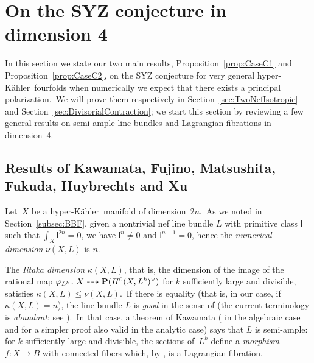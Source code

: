 \documentclass[12pt]{amsart}
\def\P{{\bf P}}
\def\phi{\varphi}
\def\otp{}
\def\dra{\dashrightarrow}
\def\hk{hyper-K\"ahler}
\theoremstyle{remark}
\def\lll{\ensuremath{\mathsf l}}
\begin{document}

\section{On the SYZ conjecture in dimension 4}\label{sec:SYZ}

In this section we state our two main results, Proposition~\ref{prop:CaseC1} and Proposition~\ref{prop:CaseC2}, on the SYZ conjecture for very general \hk\ fourfolds when numerically we expect that there exists a principal polarization.\
We will prove them respectively in Section~\ref{sec:TwoNefIsotropic} and Section~\ref{sec:DivisorialContraction}; we start this section by reviewing a few general results on semi-ample line bundles and Lagrangian fibrations in dimension~4.

\subsection{Results of Kawamata, Fujino, Matsushita, Fukuda, Huybrechts and Xu}\label{subsec:Lagrangian4folds}

Let~$X$ be a \hk\ manifold of dimension~$2n$.\
As we noted in Section~\ref{subsec:BBF}, given a nontrivial nef line bundle $L$ with primitive class $\lll$ such that $\int_X \lll^{2n}=0$, we have $\lll^{n}\ne0$ and $\lll^{n+1}=0$, hence the {\em numerical dimension} $\nu(X,L)$ is $n$.\

The {\em Iitaka dimension} $\kappa(X,L)$, that is, the dimension of the image of the  rational map $\phi_{L^{\otp k}}\colon X\dra \P(H^0(X,L^{\otp k})^\vee)$ for $k$ sufficiently large and divisible, satisfies $\kappa(X,L)\le \nu(X,L)$.\
If there is equality (that is, in our case, if $\kappa(X,L)=n$), the line bundle $L$ is {\em good} in the sense of \cite[Section~1]{kaw} (the current terminology is {\em abundant}; see \cite[Definition~2.2]{fuj}).\
In that case, a theorem of Kawamata (\cite[Theorem~6.1]{kaw} in the algebraic case and \cite[Theorem~4.8]{fuj} for a simpler proof also valid in the analytic case) says that $L$ is semi-ample: for $k$ sufficiently large and divisible, the sections of~$L^{\otp k}$  define a {\em morphism} $f\colon X\to B$ with connected fibers which, by \cite[Theorem~1]{mat}, is a Lagrangian fibration.
\end{document}
